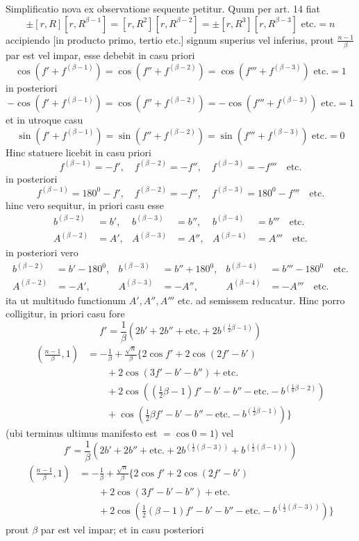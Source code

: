 Simplificatio nova ex observatione sequente petitur. Quum per art. 14 fiat
\[
\pm[r,R][r,R^{\beta-1}]=[r,R^2][r,R^{\beta-2}]=\pm[r,R^3][r,R^{\beta-3}]\text{ etc.}=n
\]
accipiendo [in producto primo, tertio etc.] signum superius vel inferius, prout $\frac{n-1}\beta$ par est vel impar, esse debebit in casu priori
\[
\cos(f'+f^{(\beta-1)})=\cos(f''+f^{(\beta-2)})=\cos(f'''+f^{(\beta-3)})\text{ etc.}=1
\]
in posteriori
\[
-\cos(f'+f^{(\beta-1)})=\cos(f''+f^{(\beta-2)})=-\cos(f'''+f^{(\beta-3)})\text{ etc.}=1
\]
et in utroque casu
\[
\sin(f'+f^{(\beta-1)})=\sin(f''+f^{(\beta-2)})=\sin(f'''+f^{(\beta-3)})\text{ etc.}=0
\]
Hinc statuere licebit in casu priori
\[
f^{(\beta-1)}=-f',\quad f^{(\beta-2)}=-f'',\quad f^{(\beta-3)}=-f'''\quad\text{etc.}
\]
in posteriori
\[
f^{(\beta-1)}=180^0-f',\quad f^{(\beta-2)}=-f'',\quad f^{(\beta-3)}=180^0-f'''\quad\text{etc.}
\]
hinc vero sequitur, in priori casu esse
\[
\begin{aligned}
b^{(\beta-2)}&=b',&b^{(\beta-3)}&=b'',&b^{(\beta-4)}&=b'''\quad\text{etc.}\\
A^{(\beta-2)}&=A',&A^{(\beta-3)}&=A'',&A^{(\beta-4)}&=A'''\quad\text{etc.}
\end{aligned}
\]
in posteriori vero
%
\[
\begin{aligned}
b^{(\beta-2)}&=b'-180^0,&b^{(\beta-3)}&=b''+180^0,&b^{(\beta-4)}&=b'''-180^0\quad\text{etc.}\\
A^{(\beta-2)}&=-A',&A^{(\beta-3)}&=-A'',&A^{(\beta-4)}&=-A'''\quad\text{etc.}
\end{aligned}
\]
ita ut multitudo functionum $A',A'',A'''$ etc. ad semissem reducatur. Hinc porro colligitur, in priori casu fore
\[
f'=\frac1\beta(2b'+2b''+\text{etc.}+2b^{(\frac12\beta-1)})
\]
\[
\begin{aligned}
\left(\frac{n-1}\beta,1\right)&=-\frac1\beta+\frac{\surd n}\beta\{2\cos f'+2\cos(2f'-b')\\
&\qquad+2\cos(3f'-b'-b'')+\text{etc.}\\
&\qquad+2\cos((\tfrac12\beta-1)f'-b'-b''-\text{etc.}-b^{(\frac18\beta-2)})\\
&\qquad+\cos(\tfrac12\beta f'-b'-b''-\text{etc.}-b^{(\frac12\beta-1)})\}
\end{aligned}
\]
(ubi terminus ultimus manifesto est $=\cos0=1$) vel
\[
f'=\frac1\beta(2b'+2b''+\text{etc.}+2b^{(\frac12(\beta-3))}+b^{(\frac12(\beta-1))})
\]
\[
\begin{aligned}
\left(\frac{n-1}\beta,1\right)&=-\frac1\beta+\frac{\surd n}\beta\{2\cos f'+2\cos(2f'-b')\\
&\qquad+2\cos(3f'-b'-b'')+\text{etc.}\\
&\qquad+2\cos(\tfrac12(\beta-1)f'-b'-b''-\text{etc.}-b^{(\frac12(\beta-3))})\}
\end{aligned}
\]
prout $\beta$ par est vel impar; et in casu posteriori

